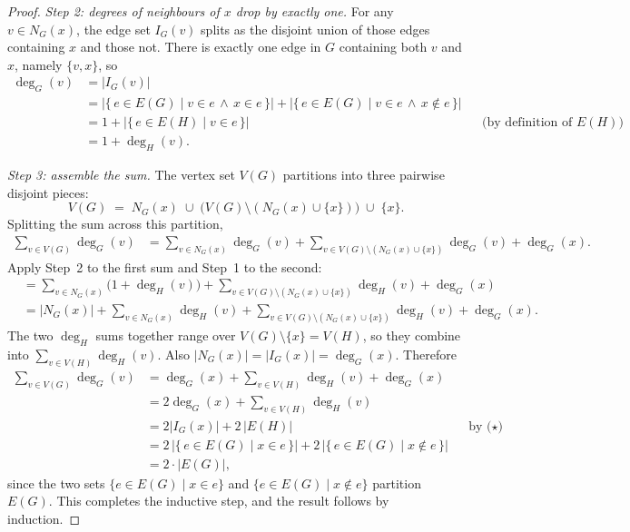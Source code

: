 \documentclass[11pt]{article}
\theoremstyle{defstyle}
\theoremstyle{thmstyle}
\theoremstyle{notstyle}
\theoremstyle{cautionstyle}
\begin{document}
\begin{proof}
\smallskip
\noindent\textit{Step 2: degrees of neighbours of $x$ drop by exactly one.}
For any $v \in N_G(x)$, the edge set $I_G(v)$ splits as the disjoint union
of those edges containing $x$ and those not. There is exactly one edge in
$G$ containing both $v$ and $x$, namely $\{v, x\}$, so
\begin{align*}
  \deg_G(v)
  &= |I_G(v)| \\
  &= |\{\, e \in E(G) \mid v \in e \,\wedge\, x \in e \,\}|
   + |\{\, e \in E(G) \mid v \in e \,\wedge\, x \notin e \,\}| \\
  &= 1 + |\{\, e \in E(H) \mid v \in e \,\}|
       && \text{(by definition of $E(H)$)}\\
  &= 1 + \deg_H(v).
\end{align*}

\smallskip
\noindent\textit{Step 3: assemble the sum.}
The vertex set $V(G)$ partitions into three pairwise disjoint pieces:
\[
  V(G) \;=\; N_G(x) \;\cup\; \bigl(V(G) \setminus (N_G(x) \cup \{x\})\bigr) \;\cup\; \{x\}.
\]
Splitting the sum across this partition,
\begin{align*}
  \sum_{v \in V(G)} \deg_G(v)
  &= \sum_{v \in N_G(x)} \deg_G(v)
   + \sum_{v \in V(G) \setminus (N_G(x) \cup \{x\})} \deg_G(v)
   + \deg_G(x).
\end{align*}
Apply Step~2 to the first sum and Step~1 to the second:
\begin{align*}
  &= \sum_{v \in N_G(x)} \bigl(1 + \deg_H(v)\bigr)
   + \sum_{v \in V(G) \setminus (N_G(x) \cup \{x\})} \deg_H(v)
   + \deg_G(x) \\
  &= |N_G(x)|
   + \sum_{v \in N_G(x)} \deg_H(v)
   + \sum_{v \in V(G) \setminus (N_G(x) \cup \{x\})} \deg_H(v)
   + \deg_G(x).
\end{align*}
The two $\deg_H$ sums together range over $V(G) \setminus \{x\} = V(H)$,
so they combine into $\sum_{v \in V(H)} \deg_H(v)$. Also
$|N_G(x)| = |I_G(x)| = \deg_G(x)$. Therefore
\begin{align*}
  \sum_{v \in V(G)} \deg_G(v)
  &= \deg_G(x) + \sum_{v \in V(H)} \deg_H(v) + \deg_G(x) \\
  &= 2\deg_G(x) + \sum_{v \in V(H)} \deg_H(v) \\
  &= 2|I_G(x)| + 2\,|E(H)| && \text{by ($\star$)} \\
  &= 2\,\bigl|\{\, e \in E(G) \mid x \in e \,\}\bigr|
   + 2\,\bigl|\{\, e \in E(G) \mid x \notin e \,\}\bigr| \\
  &= 2 \cdot |E(G)|,
\end{align*}
since the two sets $\{e \in E(G) \mid x \in e\}$ and
$\{e \in E(G) \mid x \notin e\}$ partition $E(G)$. This completes the
inductive step, and the result follows by induction.
\end{proof}
\end{document}
